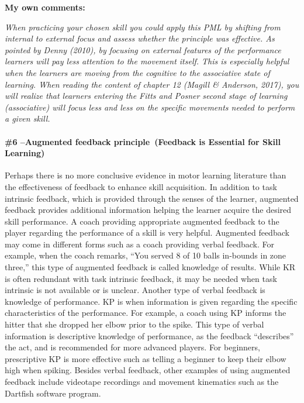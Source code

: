 \documentclass[
  letterpaper,
  DIV=11,
  numbers=noendperiod]{scrartcl}
\let\oldparagraph\paragraph
\renewcommand{\paragraph}[1]{\oldparagraph{#1}\mbox{}}
\begin{document}
\textbf{My own comments:}

\emph{When practicing your chosen skill you could apply this PML by
shifting from internal to external focus and assess whether the
principle was effective. As pointed by Denny (2010), by focusing on
external features of the performance learners will pay less attention to
the movement itself. This is especially helpful when the learners are
moving from the cognitive to the associative state of learning. When
reading the content of chapter 12 (Magill \& Anderson, 2017), you will
realize that learners entering the Fitts and Posner second stage of
learning (associative) will focus less and less on the specific
movements needed to perform a given skill.}

\hypertarget{augmented-feedback-principle-feedback-is-essential-for-skill-learning}{%
\paragraph{\texorpdfstring{\textbf{\#6 --Augmented feedback
principle~(Feedback is Essential for Skill
Learning)}}{\#6 --Augmented feedback principle~(Feedback is Essential for Skill Learning)}}\label{augmented-feedback-principle-feedback-is-essential-for-skill-learning}}

Perhaps there is no more conclusive evidence in motor learning
literature than the effectiveness of feedback to enhance skill
acquisition. In addition to task intrinsic feedback, which is provided
through the senses of the learner, augmented feedback provides
additional information helping the learner acquire the desired skill
performance. A coach providing appropriate augmented feedback to the
player regarding the performance of a skill is very helpful. Augmented
feedback may come in different forms such as a coach providing verbal
feedback. For example, when the coach remarks, ``You served 8 of 10
balls in-bounds in zone three,'' this type of augmented feedback is
called knowledge of results. While KR is often redundant with task
intrinsic feedback, it may be needed when task intrinsic is not
available or is unclear. Another type of verbal feedback is knowledge of
performance. KP is when information is given regarding the specific
characteristics of the performance. For example, a coach using KP
informs the hitter that she dropped her elbow prior to the spike. This
type of verbal information is descriptive knowledge of performance, as
the feedback ``describes'' the act, and is recommended for more advanced
players. For beginners, prescriptive KP is more effective such as
telling a beginner to keep their elbow high when spiking. Besides verbal
feedback, other examples of using augmented feedback include videotape
recordings and movement kinematics such as the Dartfish software
program.
\end{document}

